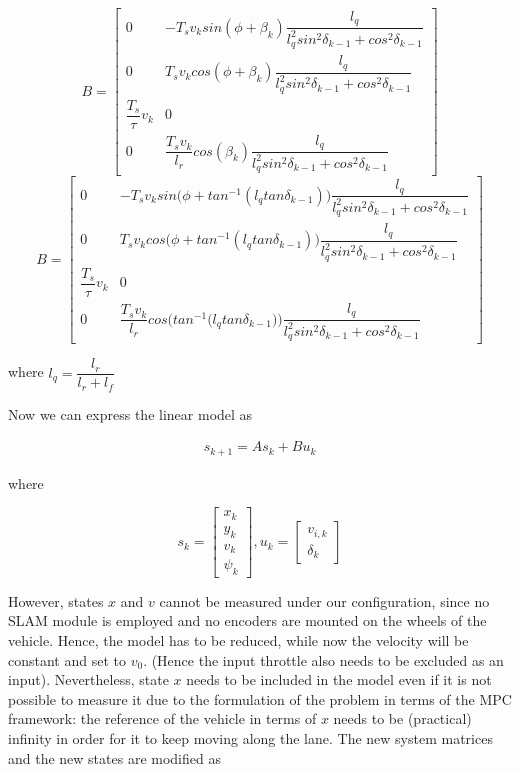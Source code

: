 \begin{equation}
 B =
  \begin{bmatrix}
    0 & -T_s v_k sin(\phi + \beta_k) \dfrac{l_q}{l_q^2 sin^2\delta_{k-1} + cos^2\delta_{k-1}} \\
    0 & T_s v_k cos(\phi + \beta_k) \dfrac{l_q}{l_q^2 sin^2\delta_{k-1} + cos^2\delta_{k-1}} \\
    \dfrac{T_s}{\tau} v_k & 0 \\
    0 & \dfrac{T_s v_k}{l_r} cos(\beta_k) \dfrac{l_q}{l_q^2 sin^2\delta_{k-1} + cos^2\delta_{k-1}}
  \end{bmatrix}
\end{equation}
\begin{equation}
  B =
  \begin{bmatrix}
    0 & -T_s v_k sin\Big(\phi + tan^{-1} (l_q tan\delta_{k-1})\Big) \dfrac{l_q}{l_q^2 sin^2\delta_{k-1} + cos^2\delta_{k-1}} \\
    0 & T_s v_k cos\Big(\phi + tan^{-1} (l_q tan\delta_{k-1})\Big) \dfrac{l_q}{l_q^2 sin^2\delta_{k-1} + cos^2\delta_{k-1}} \\
    \dfrac{T_s}{\tau} v_k & 0 \\
    0 & \dfrac{T_s v_k}{l_r} cos\Bigg(tan^{-1} \Big(l_q tan\delta_{k-1}\Big)\Bigg) \dfrac{l_q}{l_q^2 sin^2\delta_{k-1} + cos^2\delta_{k-1}}
  \end{bmatrix}
\end{equation}


where $l_q = \dfrac{l_r}{l_r + l_f}$


Now we can express the linear model as

\begin{align}
  s_{k+1} = A s_k + B u_k
\end{align}

where

\begin{equation}
  s_k=
  \begin{bmatrix}
    x_{k} \\
    y_{k} \\
    v_{k} \\
    \psi_{k}
  \end{bmatrix},
  u_k=
  \begin{bmatrix}
    v_{i,k} \\
    \delta_{k}
  \end{bmatrix}
\end{equation}


However, states $x$ and $v$ cannot be measured under our configuration, since
no SLAM module is employed and no encoders are mounted on the wheels of the
vehicle. Hence, the model has to be reduced, while now the velocity will be
constant and set to $v_0$. (Hence the input throttle also needs to be excluded
as an input). Nevertheless, state $x$ needs to be included in the
model even if it is not possible to measure it due to the formulation of the
problem in terms of the MPC framework: the reference of the vehicle in terms
of $x$ needs to be (practical) infinity in order for it to keep moving along
the lane. The new system matrices and the new states are modified as

